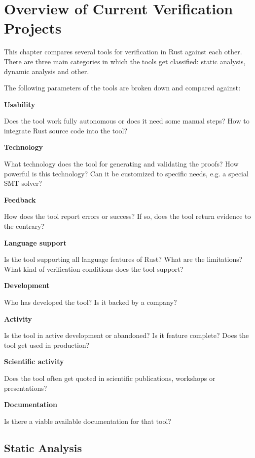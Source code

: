 \section{Overview of Current Verification Projects}

This chapter compares several tools for verification in Rust against each other.
There are three main categories in which the tools get classified: static analysis, dynamic analysis and other.

The following parameters of the tools are broken down and compared against:

\textbf{Usability}

Does the tool work fully autonomous or does it need some manual steps? How to integrate Rust source code into the tool?

\textbf{Technology}

What technology does the tool for generating and validating the proofs? How powerful is this technology? Can it be customized to specific needs, e.g. a special SMT solver?

\textbf{Feedback}

How does the tool report errors or success? If so, does the tool return evidence to the contrary?

\textbf{Language support}

Is the tool supporting all language features of Rust? What are the limitations? What kind of verification conditions does the tool support?

\textbf{Development}

Who has developed the tool? Is it backed by a company?

\textbf{Activity}

Is the tool in active development or abandoned? Is it feature complete? Does the tool get used in production?

\textbf{Scientific activity}

Does the tool often get quoted in scientific publications, workshops or presentations?

\textbf{Documentation}

Is there a viable available documentation for that tool?

\subsection{Static Analysis}